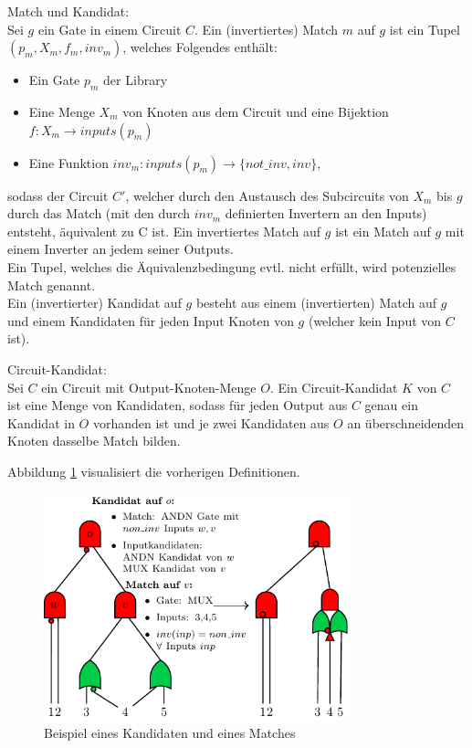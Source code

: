 \documentclass[11pt, a4paper, german]{article}
\begin{document}
\begin{definition}{Match und Kandidat:}\\
Sei $g$ ein Gate in einem Circuit $C$. Ein (invertiertes) Match $m$ auf $g$ ist ein Tupel $(p_m, X_m, f_m, inv_m)$, welches Folgendes enthält:
\begin{itemize}
\item Ein Gate $p_m$ der Library
\item Eine Menge $X_m$ von Knoten aus dem Circuit und eine Bijektion $ f: X_m \rightarrow inputs(p_m)$
\item Eine Funktion $ inv_m : inputs(p_m) \rightarrow \{not\_inv , inv \}$,
\end{itemize}
sodass der Circuit $C'$, welcher durch den Austausch des Subcircuits von $X_m$ bis $g$ durch das Match (mit den durch $inv_m$ definierten Invertern an den Inputs) entsteht, äquivalent zu C ist.
Ein invertiertes Match auf $g$ ist ein Match auf $g$ mit einem Inverter an jedem seiner Outputs.\\
Ein Tupel, welches die Äquivalenzbedingung evtl. nicht erfüllt, wird potenzielles Match genannt.\\
Ein (invertierter) Kandidat auf $g$ besteht aus einem (invertierten) Match auf $g$ und einem Kandidaten für jeden Input Knoten von $g$ (welcher kein Input von $C$ ist).
\end{definition}
\begin{definition}{Circuit-Kandidat:}\\
Sei $C$ ein Circuit mit Output-Knoten-Menge $O$. Ein Circuit-Kandidat $K$ von $C$ ist eine Menge von Kandidaten, sodass für jeden Output aus $C$ genau ein Kandidat in $O$ vorhanden ist und je zwei Kandidaten aus $O$  an überschneidenden Knoten dasselbe Match bilden.
\end{definition}
Abbildung \ref{bild:grundl_definitionen} visualisiert die vorherigen Definitionen.\\
\begin{figure}[h]
\begin{center}
 \includegraphics[width = 250pt]{./pictures/compiled/grundl_def_veransch.pdf}
 \caption{Beispiel eines  Kandidaten und eines Matches}
 \label{bild:grundl_definitionen}
\end{center}
\end{figure}
\end{document}
